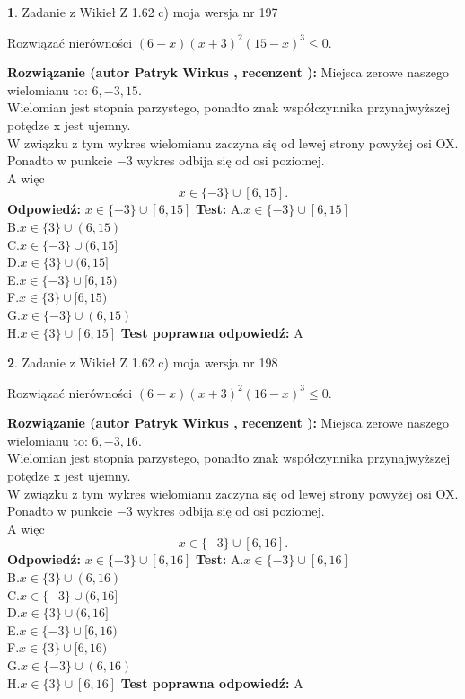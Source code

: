 \documentclass[12pt, a4paper]{article}
\theoremstyle{definition} %
\newtheorem{zad}{}
\newcommand{\zadStart}[1]{\begin{zad}#1\newline}
\newcommand{\zadStop}{\end{zad}}
\newcommand{\rozwStart}[2]{\noindent \textbf{Rozwiązanie (autor #1 , recenzent #2): }\newline}
\newcommand{\rozwStop}{\newline}
\newcommand{\odpStart}{\noindent \textbf{Odpowiedź:}\newline}
\newcommand{\odpStop}{\newline}
\newcommand{\testStart}{\noindent \textbf{Test:}\newline}
\newcommand{\testStop}{\newline}
\newcommand{\kluczStart}{\noindent \textbf{Test poprawna odpowiedź:}\newline}
\newcommand{\kluczStop}{\newline}
\begin{document}
\zadStart{Zadanie z Wikieł Z 1.62 c) moja wersja nr 197}

Rozwiązać nierówności $(6-x)(x+3)^{2}(15-x)^{3}\le0$.
\zadStop
\rozwStart{Patryk Wirkus}{}
Miejsca zerowe naszego wielomianu to: $6, -3, 15$.\\
Wielomian jest stopnia parzystego, ponadto znak współczynnika przy\linebreak najwyższej potędze x jest ujemny.\\ W związku z tym wykres wielomianu zaczyna się od lewej strony powyżej osi OX.\\
Ponadto w punkcie $-3$ wykres odbija się od osi poziomej.\\
A więc $$x \in \{-3\} \cup [6,15].$$
\rozwStop
\odpStart
$x \in \{-3\} \cup [6,15]$
\odpStop
\testStart
A.$x \in \{-3\} \cup [6,15]$\\
B.$x \in \{3\} \cup (6,15)$\\
C.$x \in \{-3\} \cup (6,15]$\\
D.$x \in \{3\} \cup (6,15]$\\
E.$x \in \{-3\} \cup [6,15)$\\
F.$x \in \{3\} \cup [6,15)$\\
G.$x \in \{-3\} \cup (6,15)$\\
H.$x \in \{3\} \cup [6,15]$
\testStop
\kluczStart
A
\kluczStop



\zadStart{Zadanie z Wikieł Z 1.62 c) moja wersja nr 198}

Rozwiązać nierówności $(6-x)(x+3)^{2}(16-x)^{3}\le0$.
\zadStop
\rozwStart{Patryk Wirkus}{}
Miejsca zerowe naszego wielomianu to: $6, -3, 16$.\\
Wielomian jest stopnia parzystego, ponadto znak współczynnika przy\linebreak najwyższej potędze x jest ujemny.\\ W związku z tym wykres wielomianu zaczyna się od lewej strony powyżej osi OX.\\
Ponadto w punkcie $-3$ wykres odbija się od osi poziomej.\\
A więc $$x \in \{-3\} \cup [6,16].$$
\rozwStop
\odpStart
$x \in \{-3\} \cup [6,16]$
\odpStop
\testStart
A.$x \in \{-3\} \cup [6,16]$\\
B.$x \in \{3\} \cup (6,16)$\\
C.$x \in \{-3\} \cup (6,16]$\\
D.$x \in \{3\} \cup (6,16]$\\
E.$x \in \{-3\} \cup [6,16)$\\
F.$x \in \{3\} \cup [6,16)$\\
G.$x \in \{-3\} \cup (6,16)$\\
H.$x \in \{3\} \cup [6,16]$
\testStop
\kluczStart
A
\kluczStop
\end{document}
